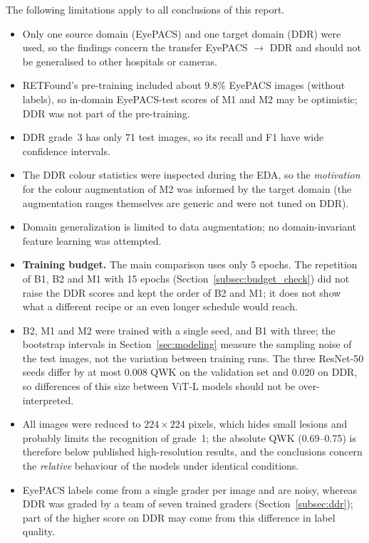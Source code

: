The following limitations apply to all conclusions of this report.
\begin{itemize}[leftmargin=1.5em]
    \item Only one source domain (EyePACS) and one target domain (DDR) were used, so the findings concern the transfer EyePACS $\rightarrow$ DDR and should not be generalised to other hospitals or cameras.
    \item RETFound's pre-training included about 9.8\% EyePACS images (without labels), so in-domain EyePACS-test scores of M1 and M2 may be optimistic; DDR was not part of the pre-training.
    \item DDR grade~3 has only 71 test images, so its recall and F1 have wide confidence intervals.
    \item The DDR colour statistics were inspected during the EDA, so the \emph{motivation} for the colour augmentation of M2 was informed by the target domain (the augmentation ranges themselves are generic and were not tuned on DDR).
    \item Domain generalization is limited to data augmentation; no domain-invariant feature learning was attempted.
    \item \textbf{Training budget.} The main comparison uses only 5 epochs. The repetition of B1, B2 and M1 with 15 epochs (Section~\ref{subsec:budget_check}) did not raise the DDR scores and kept the order of B2 and M1; it does not show what a different recipe or an even longer schedule would reach.
    \item B2, M1 and M2 were trained with a single seed, and B1 with three; the bootstrap intervals in Section~\ref{sec:modeling} measure the sampling noise of the test images, not the variation between training runs. The three ResNet-50 seeds differ by at most 0.008 QWK on the validation set and 0.020 on DDR, so differences of this size between ViT-L models should not be over-interpreted.
    \item All images were reduced to $224\times224$ pixels, which hides small lesions and probably limits the recognition of grade~1; the absolute QWK (0.69--0.75) is therefore below published high-resolution results, and the conclusions concern the \emph{relative} behaviour of the models under identical conditions.
    \item EyePACS labels come from a single grader per image and are noisy, whereas DDR was graded by a team of seven trained graders (Section~\ref{subsec:ddr}); part of the higher score on DDR may come from this difference in label quality.
\end{itemize}

